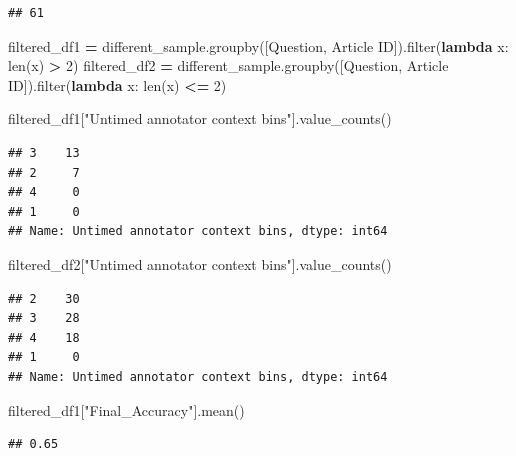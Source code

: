 \documentclass[
]{article}
\newenvironment{Shaded}{\begin{snugshade}}{\end{snugshade}}
\newcommand{\BuiltInTok}[1]{#1}
\newcommand{\DecValTok}[1]{\textcolor[rgb]{0.00,0.00,0.81}{#1}}
\newcommand{\KeywordTok}[1]{\textcolor[rgb]{0.13,0.29,0.53}{\textbf{#1}}}
\newcommand{\NormalTok}[1]{#1}
\newcommand{\OperatorTok}[1]{\textcolor[rgb]{0.81,0.36,0.00}{\textbf{#1}}}
\newcommand{\StringTok}[1]{\textcolor[rgb]{0.31,0.60,0.02}{#1}}
\begin{document}
\begin{verbatim}
## 61
\end{verbatim}

\begin{Shaded}
\begin{Highlighting}[]
\NormalTok{filtered\_df1 }\OperatorTok{=}\NormalTok{ different\_sample.groupby([}\StringTok{\textquotesingle{}Question\textquotesingle{}}\NormalTok{, }\StringTok{\textquotesingle{}Article ID\textquotesingle{}}\NormalTok{]).}\BuiltInTok{filter}\NormalTok{(}\KeywordTok{lambda}\NormalTok{ x: }\BuiltInTok{len}\NormalTok{(x) }\OperatorTok{\textgreater{}} \DecValTok{2}\NormalTok{)}
\NormalTok{filtered\_df2 }\OperatorTok{=}\NormalTok{ different\_sample.groupby([}\StringTok{\textquotesingle{}Question\textquotesingle{}}\NormalTok{, }\StringTok{\textquotesingle{}Article ID\textquotesingle{}}\NormalTok{]).}\BuiltInTok{filter}\NormalTok{(}\KeywordTok{lambda}\NormalTok{ x: }\BuiltInTok{len}\NormalTok{(x) }\OperatorTok{\textless{}=} \DecValTok{2}\NormalTok{)}

\NormalTok{filtered\_df1[}\StringTok{"Untimed annotator context bins"}\NormalTok{].value\_counts()}
\end{Highlighting}
\end{Shaded}

\begin{verbatim}
## 3    13
## 2     7
## 4     0
## 1     0
## Name: Untimed annotator context bins, dtype: int64
\end{verbatim}

\begin{Shaded}
\begin{Highlighting}[]
\NormalTok{filtered\_df2[}\StringTok{"Untimed annotator context bins"}\NormalTok{].value\_counts()}
\end{Highlighting}
\end{Shaded}

\begin{verbatim}
## 2    30
## 3    28
## 4    18
## 1     0
## Name: Untimed annotator context bins, dtype: int64
\end{verbatim}

\begin{Shaded}
\begin{Highlighting}[]
\NormalTok{filtered\_df1[}\StringTok{"Final\_Accuracy"}\NormalTok{].mean()}
\end{Highlighting}
\end{Shaded}

\begin{verbatim}
## 0.65
\end{verbatim}
\end{document}
